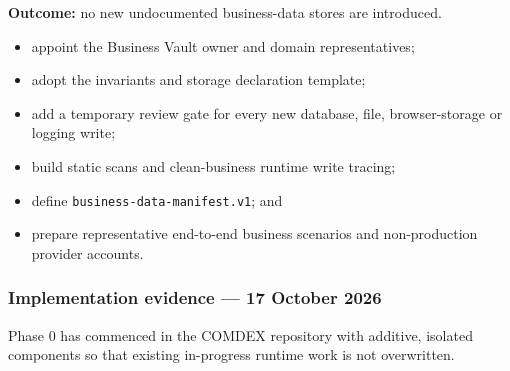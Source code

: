 \documentclass[11pt]{article}
\newcommand{\code}[1]{\texttt{#1}}
\begin{document}
\textbf{Outcome:} no new undocumented business-data stores are introduced.

\begin{itemize}
  \item appoint the Business Vault owner and domain representatives;
  \item adopt the invariants and storage declaration template;
  \item add a temporary review gate for every new database, file, browser-storage or logging write;
  \item build static scans and clean-business runtime write tracing;
  \item define \code{business-data-manifest.v1}; and
  \item prepare representative end-to-end business scenarios and non-production provider accounts.
\end{itemize}

\subsubsection*{Implementation evidence --- 17 October 2026}

Phase 0 has commenced in the COMDEX repository with additive, isolated components so that existing in-progress runtime work is not overwritten.
\end{document}
